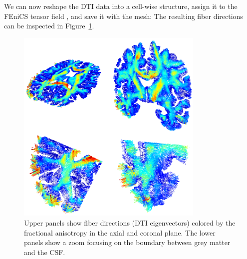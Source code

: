 We can now reshape the DTI data into a cell-wise structure,
\noindent assign it to the FEniCS tensor field ,
and save it with the mesh: 
The resulting fiber directions can be inspected in Figure~\ref{fig:chp5:freesurfer-parc}.
\begin{figure}	
  \begin{center}
  \includegraphics[width=0.8\textwidth]{./chapters/chp5/FIG/fiber-fa-2.png}
  \end{center}
\caption{Upper panels show fiber directions (DTI eigenvectors) colored
  by the fractional anisotropy in the axial and coronal plane. The
  lower panels show a zoom focusing on the boundary between grey
  matter and the CSF.}
\label{fig:chp5:freesurfer-parc} 
\end{figure}







